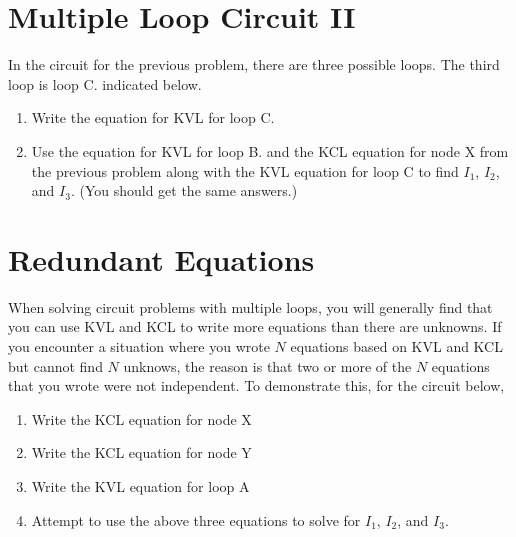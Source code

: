 \documentclass{article}
\begin{document}
\newpage

\section{Multiple Loop Circuit II}

In the circuit for the previous problem, there are three possible loops. The third loop is loop C. indicated below.



\begin{enumerate}

  \item Write the equation for KVL for loop C.

  \item Use the equation for KVL for loop B. and the KCL equation for node X from the previous problem along with the KVL equation for loop C to find $I_1$, $I_2$, and $I_3$. (You should get the same answers.)

\end{enumerate}

\section{Redundant Equations}

When solving circuit problems with multiple loops, you will generally find that you can use KVL and KCL to write more equations than there are unknowns. If you encounter a situation where you wrote $N$ equations based on KVL and KCL but cannot find $N$ unknows, the reason is that two or more of the $N$ equations that you wrote were not independent. To demonstrate this, for the circuit below,

\begin{enumerate}

  \item Write the KCL equation for node X

  \item Write the KCL equation for node Y

  \item Write the KVL equation for loop A

  \item Attempt to use the above three equations to solve for $I_1$, $I_2$, and $I_3$.

\end{enumerate}
\end{document}
